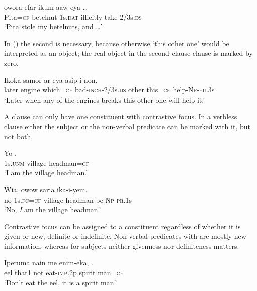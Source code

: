 \ea%
\label{ex:x1705}
\gll {}  owora  efar  ikum  aaw-eya {\dots}\\
Pita=\textsc{cf}  betelnut  1s.\textsc{dat}  illicitly  take-2/3s.\textsc{ds}\\
\glt`Pita stole my betelnuts, and {\dots}'
\z


In () the second  is necessary, because otherwise `this other one' would be interpreted as an object; the real object in the second clause clause is marked by zero.

\ea%
\label{ex:x1706}
\gll Ikoka     samor-ar-eya    asip-i-non.\\
later  engine  which=\textsc{cf}  bad-\textsc{inch}-2/3s.\textsc{ds}  other  this=\textsc{cf} help-\textsc{Np}-\textsc{fu}.3s \\
\glt`Later when any of the engines breaks this other one will help it.'
\z


A clause can only have one constituent with contrastive focus. In a verbless clause  either the subject or the non-verbal predicate can be marked with it, but not both.

\ea%
\label{ex:x1707}
\gll Yo   .\\
1s.\textsc{unm}  village  headman=\textsc{cf}\\
\glt`I am the village headman.'
\z


\ea%
\label{ex:x1708}
\gll Wia,    owow  saria  ika-i-yem. \\
no  1s.\textsc{fc}=\textsc{cf}  village  headman  be-\textsc{Np}-\textsc{pr}.1s      \\
\glt`No, \textit{I} am the village headman.'
\z


Contrastive focus can be assigned to a constituent regardless of whether it is given or new, definite or indefinite. Non-verbal predicates with  are mostly new information, whereas for subjects neither givenness nor definiteness matters.

\ea%
\label{ex:x1709}
\gll Iperuma  nain  me  enim-eka,   .\\
eel  that1  not  eat-\textsc{imp}.2p  spirit  man=\textsc{cf}\\
\glt`Don't eat the eel, it is a spirit man.'
\z


